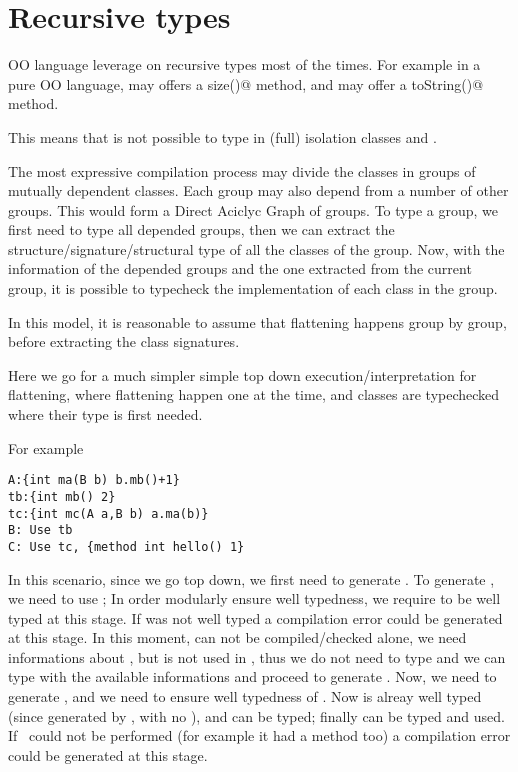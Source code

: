 \section{Recursive types}

OO language leverage on recursive types most of the times.
For example in a pure OO language, \Q@String@ may offers a \Q@Int size()@
method, and \Q@Int@ may offer a \Q@String toString()@ method.

This means that is not possible to type in (full) isolation classes
\Q@String@ and \Q@Int@.

The most expressive compilation process may divide the classes in groups of mutually 
dependent classes.
Each group may also depend from a number of other groups.
This would form a Direct Aciclyc Graph of groups.
To type a group, we first need to type all depended groups, then
we can extract the structure/signature/structural type of all
the classes of the group.
Now, with the information of the depended groups and the one extracted
from the current group, it is possible to typecheck the implementation
 of each class in the group.

In this model, it is reasonable to assume that flattening happens group by group, before
extracting the class signatures.

Here we go for a much simpler simple top down execution/interpretation for flattening, where flattening
happen one at the time, and classes are typechecked where their type is first needed.

For example
\begin{lstlisting}
A:{int ma(B b) b.mb()+1}
tb:{int mb() 2}
tc:{int mc(A a,B b) a.ma(b)}
B: Use tb
C: Use tc, {method int hello() 1}
\end{lstlisting}
In this scenario, since we go top down, we first need to generate \Q@B@.
To generate \Q@B@, we need to use \Q@tb@;
In order modularly ensure well typedness,
we require \Q@tb@ to be well typed at this stage. If \Q@tb@ was not well typed
a compilation error could be generated at this stage.
In this moment, \Q@A@ can not be compiled/checked alone,
we need informations about \Q@B@, but \Q@A@ is not used in \Q@tb@,
thus we do not need to type \Q@A@ and we can type \Q@tb@ with
 the available informations and proceed to generate \Q@B@.
Now, we need to generate \Q@C@, and we need to ensure well typedness of \Q@tc@.
Now \Q@B@ is alreay well typed (since generated by \use \Q@tb@, with no \mL),
and \Q@A@ can be typed;  finally \Q@tc@ can be typed and used.
If \use\ could not be performed (for example it \Q@tc@ had a method \Q@hello@ too)
a compilation error could be generated at this stage.


